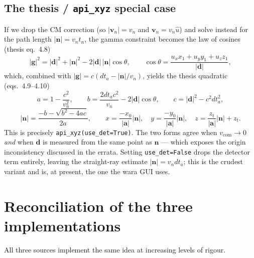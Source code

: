 \documentclass[11pt]{article}
\newcommand{\code}[1]{\texttt{\small #1}}
\newcommand{\dta}{\mathit{dt}_a}
\begin{document}
\subsection{The thesis / \texorpdfstring{\code{api\_xyz}}{api\_xyz} special case}
If we drop the CM correction (so $|\bm v_n|=v_n$ and $\bm v_n=v_n\hat u$) and
solve instead for the path length $|\bm n|=v_n t_n$, the gamma constraint becomes
the law of cosines (thesis eq.~4.8)
\begin{equation}
  |\bm g|^2=|\bm d|^2+|\bm n|^2-2|\bm d|\,|\bm n|\cos\theta,\qquad
  \cos\theta=\frac{u_x x_1+u_y y_1+u_z z_1}{|\bm d|},
\end{equation}
which, combined with $|\bm g|=c(\dta-|\bm n|/v_n)$, yields the thesis quadratic
(eqs.~4.9--4.10)
\begin{equation}
  a=1-\frac{c^2}{v_n^2},\qquad
  b=\frac{2\dta c^2}{v_n}-2|\bm d|\cos\theta,\qquad
  c=|\bm d|^2-c^2\dta^2,
\end{equation}
\begin{equation}
  |\bm n|=\frac{-b-\sqrt{b^2-4ac}}{2a},\qquad
  x=\frac{-x_0}{|\bm a|}|\bm n|,\quad
  y=\frac{-y_0}{|\bm a|}|\bm n|,\quad
  z=\frac{z_t}{|\bm a|}|\bm n|+z_t .
\end{equation}
This is precisely \code{api\_xyz(use\_det=True)}. The two forms agree when
$v_{\mathrm{com}}\to0$ \emph{and} when $\bm d$ is measured from the same point as
$\bm n$ --- which exposes the origin inconsistency discussed in the errata.
Setting \code{use\_det=False} drops the detector term entirely, leaving the
straight-ray estimate $|\bm n|=v_n\dta$; this is the crudest variant and is, at
present, the one the wara GUI uses.

\clearpage
\section{Reconciliation of the three implementations}
All three sources implement the same idea at increasing levels of rigour.
\end{document}
